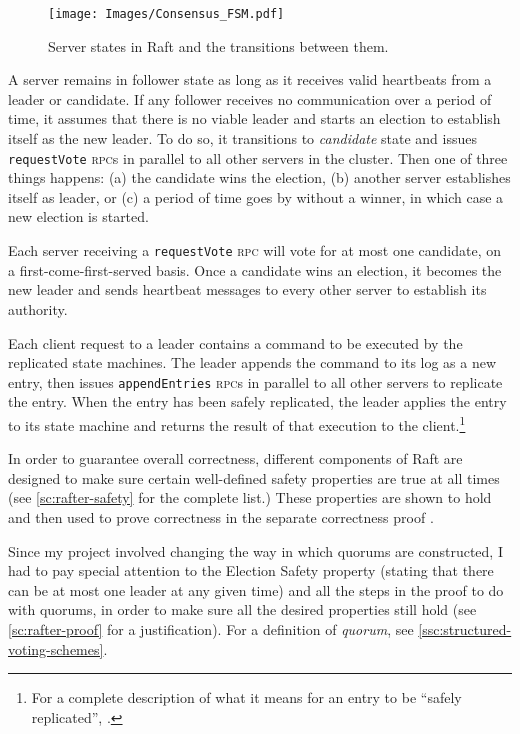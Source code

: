 \documentclass[12pt,chapterprefix=true,toc=bibliography,numbers=noendperiod,
               footnotes=multiple,twoside]{scrreprt}
\newcommand{\requestVoteRPC}[0]{\texttt{requestVote} \textsc{rpc}}
\newcommand{\appendEntriesRPC}[0]{\texttt{appendEntries} \textsc{rpc}}
\begin{document}
\begin{figure}[h]
    \centering
    \texttt{[image: Images/Consensus\_FSM.pdf]}
    \caption{Server states in Raft and the transitions between them.
        \protect{}
    }
    \label{fig:consensus-fsm}
\end{figure}


A server remains in follower state as long as it receives valid heartbeats from a leader or candidate. If any follower receives no communication over a period of time, it assumes that there is no viable leader and starts an election to establish itself as the new leader. To do so, it transitions to \textit{candidate} state and issues \requestVoteRPC s in parallel to all other servers in the cluster. Then one of three things happens: (a) the candidate wins the election, (b) another server establishes itself as leader, or (c) a period of time goes by without a winner, in which case a new election is started.

Each server receiving a \requestVoteRPC{} will vote for at most one candidate, on a first-come-first-served basis. Once a candidate wins an election, it becomes the new leader and sends heartbeat messages to every other server to establish its authority.


Each client request to a leader contains a command to be executed by the replicated state machines. The leader appends the command to its log as a new entry, then issues \appendEntriesRPC s in parallel to all other servers to replicate the entry. When the entry has been safely replicated, the leader applies the entry to its state machine and returns the result of that execution to the client.\footnote{For a complete description of what it means for an entry to be \enquote{safely replicated}, \cite[see][subsection 5.3]{raft}.}


In order to guarantee overall correctness, different components of Raft are designed to make sure certain well-defined safety properties are true at all times (see \cref{sc:rafter-safety} for the complete list.) These properties are shown to hold and then used to prove correctness in the separate correctness proof \autocite{raftproof}.

Since my project involved changing the way in which quorums are constructed, I had to pay special attention to the Election Safety property (stating that there can be at most one leader at any given time) and all the steps in the proof to do with quorums, in order to make sure all the desired properties still hold (see \cref{sc:rafter-proof} for a justification). For a definition of \emph{quorum}, see \cref{ssc:structured-voting-schemes}.
\end{document}
